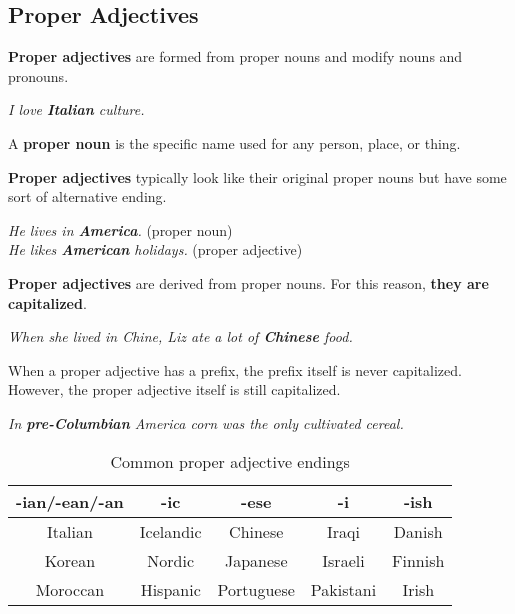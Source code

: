 \documentclass[hidelinks,10pt,a4paper]{article}
\begin{document}
\subsection{Proper Adjectives}
\textbf{Proper adjectives} are formed from proper nouns and modify nouns and pronouns.

\begin{center}
	\textit{I love \textbf{Italian} culture.}
\end{center}

A \textbf{proper noun} is the specific name used for any person, place, or thing.

\textbf{Proper adjectives} typically look like their original proper nouns but have some sort of alternative ending.

\begin{center}
	\textit{He lives in \textbf{America}. } (proper noun) \\
	\textit{He likes \textbf{American} holidays.} (proper adjective)
\end{center}

\textbf{Proper adjectives} are derived from proper nouns. For this reason, \textbf{they are capitalized}.

\begin{center}
	\textit{When she lived in Chine, Liz ate a lot of \textbf{Chinese} food.}
\end{center}

When a proper adjective has a prefix, the prefix itself is never capitalized. However, the proper adjective itself is still capitalized.

\begin{center}
	\textit{In \textbf{pre-Columbian} America corn was the only cultivated cereal.}
\end{center}

\begin{table}[h]
\begin{center}
\begin{tabular}{|c|c|c|c|c|}
	\hline
	\textbf{-ian/-ean/-an} & \textbf{-ic} & \textbf{-ese} & \textbf{-i} & \textbf{-ish} \\ \hline
	Italian & Icelandic & Chinese & Iraqi & Danish \\ \hline
	Korean & Nordic & Japanese & Israeli & Finnish \\ \hline
	Moroccan & Hispanic & Portuguese & Pakistani & Irish \\ \hline
\end{tabular}
\end{center}
\caption{Common proper adjective endings} \label{tab:pa1}
\end{table}
\end{document}
